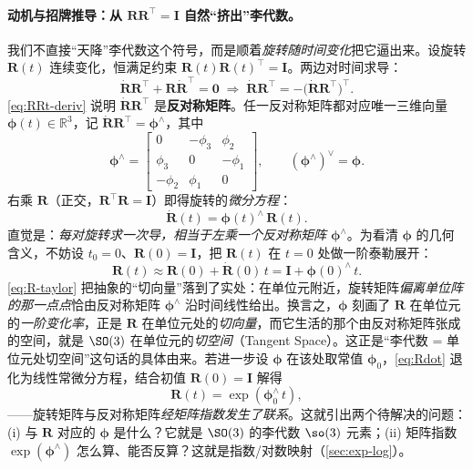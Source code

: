\paragraph{动机与招牌推导：从 $\mathbf{R}\mathbf{R}^\top=\mathbf{I}$ 自然“挤出”李代数。}
我们不直接“天降”李代数这个符号，而是顺着\emph{旋转随时间变化}把它逼出来\cite{gaoxiang2019slam14}。设旋转 $\mathbf{R}(t)$ 连续变化，恒满足约束 $\mathbf{R}(t)\mathbf{R}(t)^\top=\mathbf{I}$。两边对时间求导：
\begin{equation}
  \dot{\mathbf{R}}\mathbf{R}^\top+\mathbf{R}\dot{\mathbf{R}}^\top=\mathbf{0}
  \;\Longrightarrow\;
  \dot{\mathbf{R}}\mathbf{R}^\top=-\big(\dot{\mathbf{R}}\mathbf{R}^\top\big)^\top.
  \label{eq:RRt-deriv}
\end{equation}
\cref{eq:RRt-deriv} 说明 $\dot{\mathbf{R}}\mathbf{R}^\top$ 是\textbf{反对称矩阵}。任一反对称矩阵都对应唯一三维向量 $\boldsymbol{\phi}(t)\in\mathbb{R}^3$，记 $\dot{\mathbf{R}}\mathbf{R}^\top=\boldsymbol{\phi}^\wedge$，其中
\begin{equation}
  \boldsymbol{\phi}^\wedge=\begin{bmatrix}0&-\phi_3&\phi_2\\\phi_3&0&-\phi_1\\-\phi_2&\phi_1&0\end{bmatrix},\qquad (\boldsymbol{\phi}^\wedge)^\vee=\boldsymbol{\phi}.
  \label{eq:hat}
\end{equation}
右乘 $\mathbf{R}$（正交，$\mathbf{R}^\top\mathbf{R}=\mathbf{I}$）即得旋转的\emph{微分方程}：
\begin{equation}
  \dot{\mathbf{R}}(t)=\boldsymbol{\phi}(t)^\wedge\,\mathbf{R}(t).
  \label{eq:Rdot}
\end{equation}
直觉是：\emph{每对旋转求一次导，相当于左乘一个反对称矩阵 $\boldsymbol{\phi}^\wedge$}。为看清 $\boldsymbol{\phi}$ 的几何含义，不妨设 $t_0=0$、$\mathbf{R}(0)=\mathbf{I}$，把 $\mathbf{R}(t)$ 在 $t=0$ 处做一阶泰勒展开\cite{gaoxiang2019slam14}：
\begin{equation}
  \mathbf{R}(t)\approx\mathbf{R}(0)+\dot{\mathbf{R}}(0)\,t=\mathbf{I}+\boldsymbol{\phi}(0)^\wedge\,t.
  \label{eq:R-taylor}
\end{equation}
\cref{eq:R-taylor} 把抽象的“切向量”落到了实处：在单位元附近，旋转矩阵\emph{偏离单位阵的那一点点}恰由反对称矩阵 $\boldsymbol{\phi}^\wedge$ 沿时间线性给出。换言之，$\boldsymbol{\phi}$ 刻画了 $\mathbf{R}$ 在单位元的\emph{一阶变化率}，正是 $\mathbf{R}$ 在单位元处的\emph{切向量}，而它生活的那个由反对称矩阵张成的空间，就是 $\SO(3)$ 在单位元的\emph{切空间}（Tangent Space）。这正是“李代数 = 单位元处切空间”这句话的具体由来。若进一步设 $\boldsymbol{\phi}$ 在该处取常值 $\boldsymbol{\phi}_0$，\cref{eq:Rdot} 退化为线性常微分方程，结合初值 $\mathbf{R}(0)=\mathbf{I}$ 解得
\begin{equation}
  \mathbf{R}(t)=\exp(\boldsymbol{\phi}_0^\wedge\, t),
  \label{eq:exp-emerge}
\end{equation}
——旋转矩阵与反对称矩阵\emph{经矩阵指数发生了联系}。这就引出两个待解决的问题：(i) 与 $\mathbf{R}$ 对应的 $\boldsymbol{\phi}$ 是什么？它就是 $\SO(3)$ 的李代数 $\so(3)$ 元素；(ii) 矩阵指数 $\exp(\boldsymbol{\phi}^\wedge)$ 怎么算、能否反算？这就是指数/对数映射（\cref{sec:exp-log}）。

